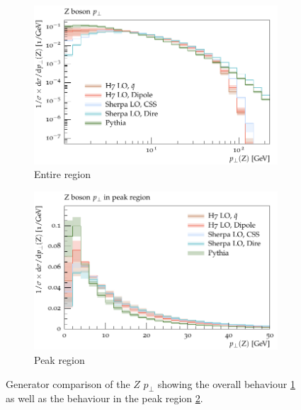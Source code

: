 \begin{figure}[h]
  \centering
    \begin{subfigure}[t]{0.49\textwidth}
    \includegraphics[width=\textwidth]{plots/Z-91-MuShower/LH_Z/X_pT.pdf}
    \caption{Entire region}
    \label{fig:z:pt_full}
  \end{subfigure}
%
  \begin{subfigure}[t]{0.49\textwidth}
    \includegraphics[width=\textwidth]{plots/Z-91-MuShower/LH_Z/X_pT_peak.pdf}
    \caption{Peak region}
    \label{fig:z:pt_peak}
  \end{subfigure}
  \caption{Generator comparison of the $Z$ $p_\perp$ showing the overall behaviour \ref{fig:z:pt_full} as well as the behaviour in the peak region \ref{fig:z:pt_peak}.}
  \label{fig:z:pt}
\end{figure}

